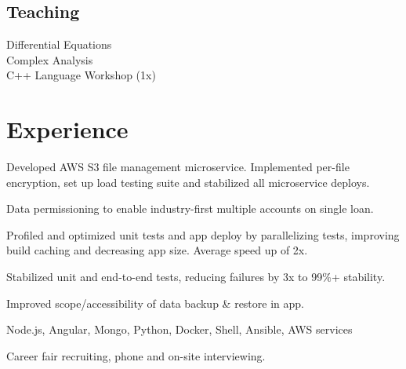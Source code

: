 \documentclass[]{yubo-resume-openfont}
\begin{document}
\begin{minipage}[t]{0.33\textwidth}
    \subsection{Teaching}
        Differential Equations\\
        Complex Analysis\\
        C++ Language Workshop (1x)
    \sectionsep

%
%

\end{minipage}
\hfill
\begin{minipage}[t]{0.66\textwidth}


\section{Experience}

\vspace{\topsep} %
\begin{tightemize}
    \item Developed AWS S3 file management microservice. Implemented per-file
        encryption, set up load testing suite and stabilized all microservice
        deploys.
    \item Data permissioning to enable industry-first multiple accounts on
        single loan.
    \item Profiled and optimized unit tests and app deploy by parallelizing
        tests, improving build caching and decreasing app size. Average speed
        up of 2x.
    \item Stabilized unit and end-to-end tests, reducing failures by 3x to 99\%+
        stability.
    \item Improved scope/accessibility of data backup \& restore in app.
    \item Node.js, Angular, Mongo, Python, Docker, Shell, Ansible, AWS services
    \item Career fair recruiting, phone and on-site interviewing.
\end{tightemize}
\sectionsep



\end{minipage}
\end{document}

